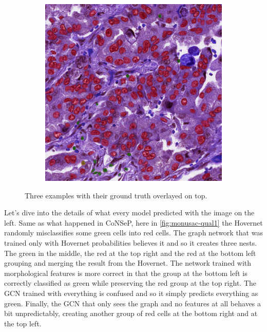 \begin{figure}[H]
\begin{subfigure}[b]{0.3\textwidth}
  \end{subfigure}
  \begin{subfigure}[b]{0.3\textwidth}
    \includegraphics[width=\textwidth]{imgs/qual/monusac/gt3.overlay.png}
  \end{subfigure}
    \caption{Three examples with their ground truth overlayed on top.}
    \label{fig:monusac-ex}
\end{figure}

Let's dive into the details of what every model predicted with the image on the left. Same as what happened in CoNSeP, here in \autoref{fig:monusac-qual1} the Hovernet randomly misclassifies some green cells into red cells. The graph network that was trained only with Hovernet probabilities believes it and so it creates three nests. The green in the middle, the red at the top right and the red at the bottom left grouping and merging the result from the Hovernet. The network trained with morphological features is more correct in that the group at the bottom left is correctly classified as green while preserving the red group at the top right. The GCN trained with everything is confused and so it simply predicts everything as green. Finally, the GCN that only sees the graph and no features at all behaves a bit unpredictably, creating another group of red cells at the bottom right and at the top left.

